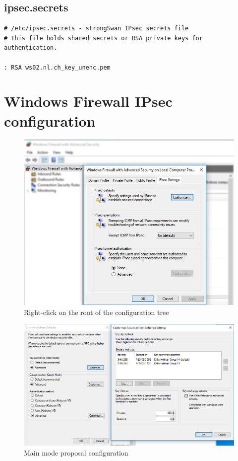 \documentclass[a4paper]{report}
\begin{document}
\section{ipsec.secrets}
\label{app-sec:ipsec.secrets-P2P}
\begin{lstlisting}
# /etc/ipsec.secrets - strongSwan IPsec secrets file
# This file holds shared secrets or RSA private keys for authentication.

: RSA ws02.nl.ch_key_unenc.pem

\end{lstlisting}

\chapter{Windows Firewall IPsec configuration}
\label{app-sec:WinIPsecConf}

\begin{figure}[h!]
	\includegraphics[width=\linewidth,keepaspectratio]{IPsec_Defaults}
	\caption{Right-click on the root of the configuration tree}
\end{figure}

\begin{figure}[h!]
	\includegraphics[width=\linewidth,keepaspectratio]{IPsec_Defaults_MainMode}
	\caption{Main mode proposal configuration}
\end{figure}
\end{document}
